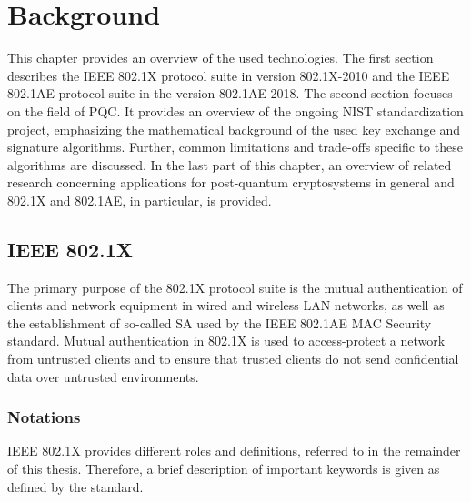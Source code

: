 \chapter{Background}

This chapter provides an overview of the used technologies. The first section describes the IEEE 802.1X protocol suite in version 802.1X-2010 and the IEEE 802.1AE protocol suite in the version 802.1AE-2018. The second section focuses on the field of \ac{PQC}. It provides an overview of the ongoing \ac{NIST} standardization project, emphasizing the mathematical background of the used key exchange and signature algorithms. Further, common limitations and trade-offs specific to these algorithms are discussed. In the last part of this chapter, an overview of related research concerning applications for post-quantum cryptosystems in general and 802.1X and 802.1AE, in particular, is provided.

\section{IEEE 802.1X}
The primary purpose of the 802.1X protocol suite is the mutual authentication of clients and network equipment in wired and wireless \ac{LAN} networks, as well as the establishment of so-called \ac{SA} used by the IEEE 802.1AE MAC Security standard\cite{IEEE8021X}. Mutual authentication in 802.1X is used to access-protect a network from untrusted clients and to ensure that trusted clients do not send confidential data over untrusted environments.

\subsection{Notations}
IEEE 802.1X provides different roles and definitions, referred to in the remainder of this thesis. Therefore, a brief description of important keywords is given as defined by the standard\cite{IEEE8021X}.

